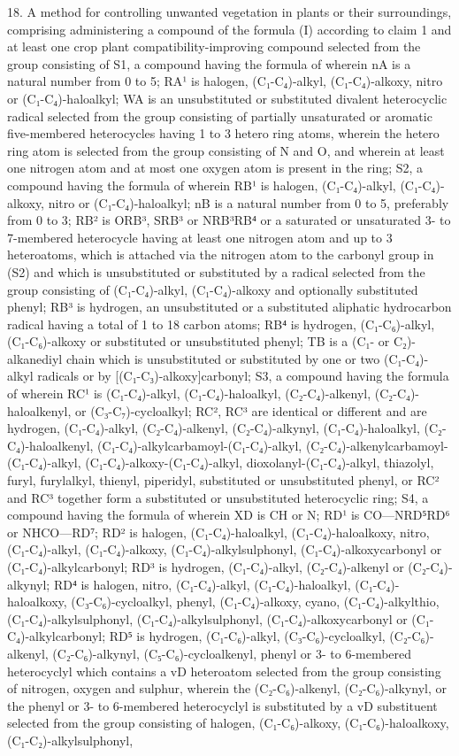 \documentclass[11pt,a4paper]{article}
\begin{document}
18. A method for controlling unwanted vegetation in plants or their surroundings, comprising administering a compound of the formula (I) according to claim 1 and at least one crop plant compatibility-improving compound selected from the group consisting of S1, a compound having the formula of wherein nA is a natural number from 0 to 5; RA¹ is halogen, (C₁-C₄)-alkyl, (C₁-C₄)-alkoxy, nitro or (C₁-C₄)-haloalkyl; WA is an unsubstituted or substituted divalent heterocyclic radical selected from the group consisting of partially unsaturated or aromatic five-membered heterocycles having 1 to 3 hetero ring atoms, wherein the hetero ring atom is selected from the group consisting of N and O, and wherein at least one nitrogen atom and at most one oxygen atom is present in the ring; S2, a compound having the formula of wherein RB¹ is halogen, (C₁-C₄)-alkyl, (C₁-C₄)-alkoxy, nitro or (C₁-C₄)-haloalkyl; nB is a natural number from 0 to 5, preferably from 0 to 3; RB² is ORB³, SRB³ or NRB³RB⁴ or a saturated or unsaturated 3- to 7-membered heterocycle having at least one nitrogen atom and up to 3 heteroatoms, which is attached via the nitrogen atom to the carbonyl group in (S2) and which is unsubstituted or substituted by a radical selected from the group consisting of (C₁-C₄)-alkyl, (C₁-C₄)-alkoxy and optionally substituted phenyl; RB³ is hydrogen, an unsubstituted or a substituted aliphatic hydrocarbon radical having a total of 1 to 18 carbon atoms; RB⁴ is hydrogen, (C₁-C₆)-alkyl, (C₁-C₆)-alkoxy or substituted or unsubstituted phenyl; TB is a (C₁- or C₂)-alkanediyl chain which is unsubstituted or substituted by one or two (C₁-C₄)-alkyl radicals or by [(C₁-C₃)-alkoxy]carbonyl; S3, a compound having the formula of wherein RC¹ is (C₁-C₄)-alkyl, (C₁-C₄)-haloalkyl, (C₂-C₄)-alkenyl, (C₂-C₄)-haloalkenyl, or (C₃-C₇)-cycloalkyl; RC², RC³ are identical or different and are hydrogen, (C₁-C₄)-alkyl, (C₂-C₄)-alkenyl, (C₂-C₄)-alkynyl, (C₁-C₄)-haloalkyl, (C₂-C₄)-haloalkenyl, (C₁-C₄)-alkylcarbamoyl-(C₁-C₄)-alkyl, (C₂-C₄)-alkenylcarbamoyl-(C₁-C₄)-alkyl, (C₁-C₄)-alkoxy-(C₁-C₄)-alkyl, dioxolanyl-(C₁-C₄)-alkyl, thiazolyl, furyl, furylalkyl, thienyl, piperidyl, substituted or unsubstituted phenyl, or RC² and RC³ together form a substituted or unsubstituted heterocyclic ring; S4, a compound having the formula of wherein XD is CH or N; RD¹ is CO—NRD⁵RD⁶ or NHCO—RD⁷; RD² is halogen, (C₁-C₄)-haloalkyl, (C₁-C₄)-haloalkoxy, nitro, (C₁-C₄)-alkyl, (C₁-C₄)-alkoxy, (C₁-C₄)-alkylsulphonyl, (C₁-C₄)-alkoxycarbonyl or (C₁-C₄)-alkylcarbonyl; RD³ is hydrogen, (C₁-C₄)-alkyl, (C₂-C₄)-alkenyl or (C₂-C₄)-alkynyl; RD⁴ is halogen, nitro, (C₁-C₄)-alkyl, (C₁-C₄)-haloalkyl, (C₁-C₄)-haloalkoxy, (C₃-C₆)-cycloalkyl, phenyl, (C₁-C₄)-alkoxy, cyano, (C₁-C₄)-alkylthio, (C₁-C₄)-alkylsulphonyl, (C₁-C₄)-alkylsulphonyl, (C₁-C₄)-alkoxycarbonyl or (C₁-C₄)-alkylcarbonyl; RD⁵ is hydrogen, (C₁-C₆)-alkyl, (C₃-C₆)-cycloalkyl, (C₂-C₆)-alkenyl, (C₂-C₆)-alkynyl, (C₅-C₆)-cycloalkenyl, phenyl or 3- to 6-membered heterocyclyl which contains a vD heteroatom selected from the group consisting of nitrogen, oxygen and sulphur, wherein the (C₂-C₆)-alkenyl, (C₂-C₆)-alkynyl, or the phenyl or 3- to 6-membered heterocyclyl is substituted by a vD substituent selected from the group consisting of halogen, (C₁-C₆)-alkoxy, (C₁-C₆)-haloalkoxy, (C₁-C₂)-alkylsulphonyl, 
\end{document}

